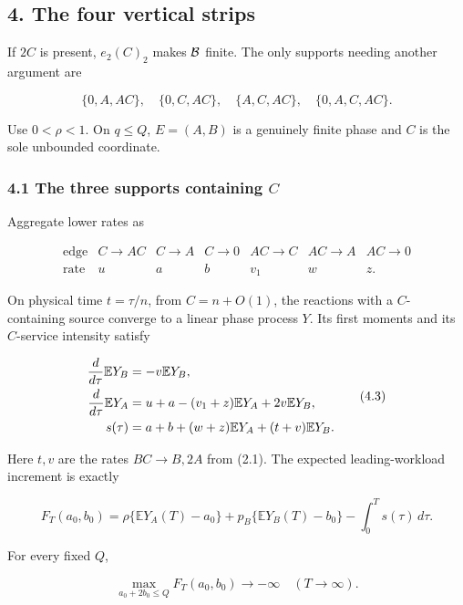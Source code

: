 \subsection{4. The four vertical strips}

If \(2C\) is present, \(e_2(C)_2\) makes \({\cal B}\) finite. The only
supports needing another argument are

\[
 \{0,A,AC\},\quad \{0,C,AC\},\quad
 \{A,C,AC\},\quad \{0,A,C,AC\}.                           \tag{4.1}
\]

Use \(0<\rho<1\). On \(q\le Q\), \(E=(A,B)\) is a genuinely finite phase
and \(C\) is the sole unbounded coordinate.

\subsubsection{\texorpdfstring{4.1 The three supports containing
\(C\)}{4.1 The three supports containing C}}

Aggregate lower rates as

\[
\begin{array}{c|ccc|ccc}
\text{edge}&C\to AC&C\to A&C\to0&AC\to C&AC\to A&AC\to0\\
\hline
\text{rate}&u&a&b&v_1&w&z .
\end{array}                                                \tag{4.2}
\]

On physical time \(t=\tau/n\), from \(C=n+O(1)\), the reactions with a
\(C\)-containing source converge to a linear phase process \(Y\). Its
first moments and its \(C\)-service intensity satisfy

\[
\begin{split}
 {d\over d\tau}\mathbb EY_B&=-v\mathbb EY_B,\\
 {d\over d\tau}\mathbb EY_A
 &=u+a-(v_1+z)\mathbb EY_A+2v\mathbb EY_B,\\
 s(\tau)&=a+b+(w+z)\mathbb EY_A+(t+v)\mathbb EY_B .
\end{split}                                               \tag{4.3}
\]

Here \(t,v\) are the rates \(BC\to B,2A\) from (2.1). The expected
leading-workload increment is exactly

\[
 F_T(a_0,b_0)
 =\rho\{\mathbb EY_A(T)-a_0\}
  +p_B\{\mathbb EY_B(T)-b_0\}
  -\int_0^Ts(\tau)\,d\tau.                               \tag{4.4}
\]

For every fixed \(Q\),

\[
 \max_{a_0+2b_0\le Q}F_T(a_0,b_0)\longrightarrow-\infty
 \quad(T\to\infty).                                      \tag{4.5}
\]

